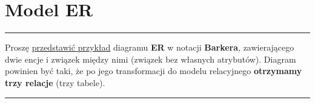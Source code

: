 \documentclass[a5paper,6pt]{article}
\newcommand{\horrule}[1]{\rule{\linewidth}{#1}}
\def\property#1{\node[name=\entityname-#1, every property/.try]{#1};}
\def\properties{\begingroup\catcode`\_=11\relax\processproperties}
\def\processproperties#1{\endgroup%
    \def\propertycode{}%
    \foreach \p in {#1}{%
        \expandafter\expandafter\expandafter\gdef\expandafter\expandafter\expandafter\propertycode%
            \expandafter\expandafter\expandafter{\expandafter\propertycode\expandafter\property\expandafter{\p}\\}%
    }%
    \propertycode%
}
\begin{document}

\pagebreak

    \section{Model ER} %
    \label{sec:model_er}

    \horrule{0.5pt}
    Proszę \underline{przedstawić przykład} diagramu \textbf{ER} w notacji
    \textbf{Barkera}, zawierającego dwie encje i związek między nimi (związek
    bez własnych atrybutów). Diagram powinien być taki, że po jego
    transformacji do modelu relacyjnego \textbf{otrzymamy trzy relacje} (trzy
    tabele).\\
    \horrule{0.5pt}


\begin{center}
\end{center}


\end{document}

